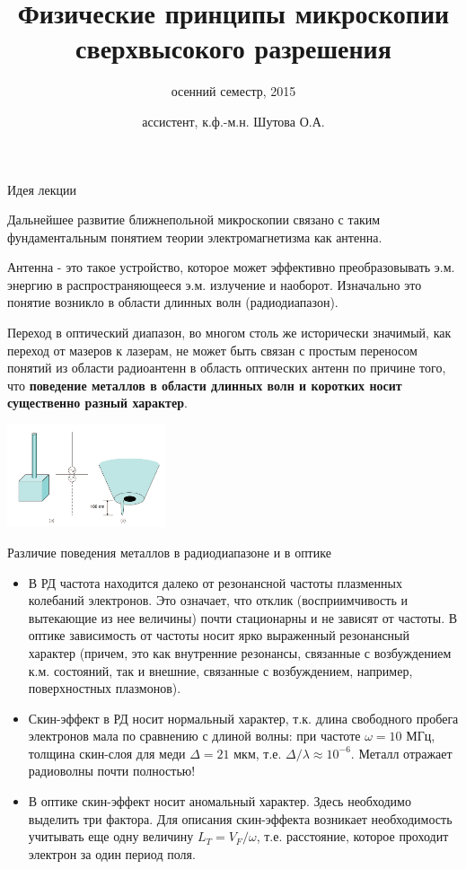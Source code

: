 \documentclass[9pt, compress, xcolor=table]{beamer}
\title{Физические принципы микроскопии сверхвысокого разрешения}
\subtitle{осенний семестр, 2015}
\author{ассистент, к.ф.-м.н. Шутова О.А.}
\institute{МГУ им. М.В. Ломоносова, физический факультет}
\begin{document}
\maketitle


\begin{frame}{Идея лекции}


Дальнейшее развитие ближнепольной микроскопии связано с таким фундаментальным понятием теории электромагнетизма как \textcolor{red!50!black}{антенна}. 

\textcolor{red!50!black}{Антенна} - это такое устройство, которое может \textcolor{red!50!black}{эффективно} преобразовывать э.м. энергию в распространяющееся э.м. излучение и наоборот. Изначально это понятие возникло в области длинных волн (радиодиапазон).

Переход в оптический диапазон, во многом столь же исторически значимый, как переход от мазеров к лазерам, не может быть связан с простым переносом понятий из области радиоантенн в область оптических антенн по причине того, что \textbf{поведение металлов в области длинных волн и коротких носит существенно разный характер}.

\centering
\includegraphics[width=0.35\textwidth]{optant1}
\end{frame}

\begin{frame}{Различие поведения металлов в радиодиапазоне и в оптике}
\begin{itemize}
\item В РД частота находится далеко от резонансной частоты плазменных колебаний электронов. Это означает, что отклик (восприимчивость и вытекающие из нее величины) почти стационарны и не зависят от частоты. В оптике зависимость от частоты носит ярко выраженный резонансный характер (причем, это как внутренние резонансы, связанные с возбуждением к.м. состояний, так и внешние, связанные с возбуждением, например, поверхностных плазмонов).
\item Скин-эффект в РД носит нормальный характер, т.к. длина свободного пробега электронов мала по сравнению с длиной волны: при частоте $\omega = 10$ МГц, толщина скин-слоя для меди $\Delta = 21$ мкм, т.е. \textcolor{red!50!black}{ $\Delta/\lambda \approx 10^{-6}$}. Металл отражает радиоволны почти полностью!

\item В оптике скин-эффект носит аномальный характер. Здесь  необходимо выделить три фактора. Для описания скин-эффекта возникает необходимость учитывать еще одну величину $L_T=V_F/\omega$, т.е. расстояние, которое проходит электрон за один период поля.
\end{itemize}

\end{frame}
\end{document}
